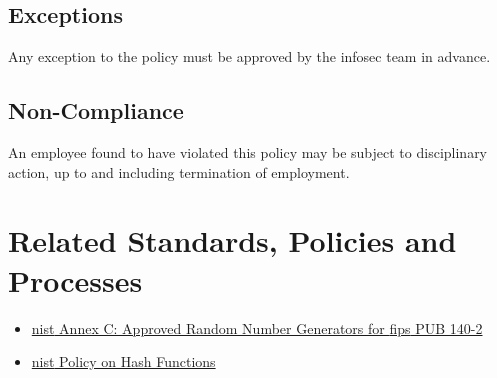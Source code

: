 \subsection{Exceptions}
Any exception to the policy must be approved by the \gls{infosec} team in advance. 
\subsection{Non-Compliance}
An employee found to have violated this policy may be subject to disciplinary action, up to and including termination of employment. 
\section{Related Standards, Policies and Processes}
\begin{itemize}
\item
\href{http://csrc.nist.gov/publications/fips/fips140-2/fips1402annexc.pdf}{\acrshort{nist} Annex C: Approved Random Number Generators for \acrshort{fips} PUB 140-2}
\item
\href{http://csrc.nist.gov/groups/ST/hash/policy.html}{\acrshort{nist} Policy on Hash Functions}
\end{itemize}